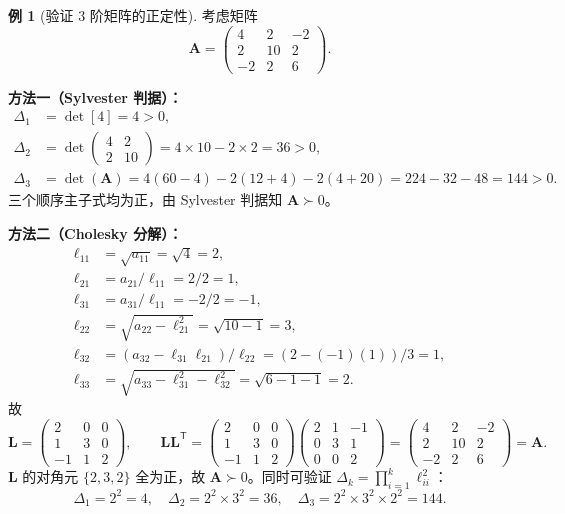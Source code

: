 \documentclass[12pt,a4paper]{article}
\theoremstyle{mystyle}
\theoremstyle{proofstyle}
\theoremstyle{definition}
\newtheorem{example}[theorem]{例}
\theoremstyle{remark}
\newcommand{\T}{^{\mathsf{T}}}
\newcommand{\A}{\mathbf{A}}
\newcommand{\Lmat}{\mathbf{L}}
\begin{document}
\begin{example}[验证 3 阶矩阵的正定性]
考虑矩阵
\[
    \A = \begin{pmatrix}
        4 & 2 & -2 \\
        2 & 10 & 2 \\
        -2 & 2 & 6
    \end{pmatrix}.
\]

\textbf{方法一（Sylvester 判据）：}
\begin{align*}
    \Delta_1 &= \det[4] = 4 > 0, \\
    \Delta_2 &= \det\begin{pmatrix} 4 & 2 \\ 2 & 10 \end{pmatrix} = 4\times 10 - 2\times 2 = 36 > 0, \\
    \Delta_3 &= \det(\A) = 4(60-4) - 2(12+4) - 2(4+20) = 224 - 32 - 48 = 144 > 0.
\end{align*}
三个顺序主子式均为正，由 Sylvester 判据知 $\A \succ 0$。

\textbf{方法二（Cholesky 分解）：}
\begin{align*}
    \ell_{11} &= \sqrt{a_{11}} = \sqrt{4} = 2,\\
    \ell_{21} &= a_{21}/\ell_{11} = 2/2 = 1,\\
    \ell_{31} &= a_{31}/\ell_{11} = -2/2 = -1,\\
    \ell_{22} &= \sqrt{a_{22} - \ell_{21}^2} = \sqrt{10 - 1} = 3,\\
    \ell_{32} &= (a_{32} - \ell_{31}\ell_{21})/\ell_{22} = (2 - (-1)(1))/3 = 1,\\
    \ell_{33} &= \sqrt{a_{33} - \ell_{31}^2 - \ell_{32}^2} = \sqrt{6 - 1 - 1} = 2.
\end{align*}
故
\[
    \Lmat = \begin{pmatrix}
        2 & 0 & 0 \\
        1 & 3 & 0 \\
        -1 & 1 & 2
    \end{pmatrix},\qquad
    \Lmat\Lmat\T = \begin{pmatrix}
        2 & 0 & 0 \\ 1 & 3 & 0 \\ -1 & 1 & 2
    \end{pmatrix}
    \begin{pmatrix}
        2 & 1 & -1 \\ 0 & 3 & 1 \\ 0 & 0 & 2
    \end{pmatrix}
    = \begin{pmatrix}
        4 & 2 & -2 \\ 2 & 10 & 2 \\ -2 & 2 & 6
    \end{pmatrix} = \A.
\]
$\Lmat$ 的对角元 $\{2,3,2\}$ 全为正，故 $\A \succ 0$。同时可验证 $\Delta_k = \prod_{i=1}^k \ell_{ii}^2$：
\[
    \Delta_1 = 2^2 = 4,\quad \Delta_2 = 2^2 \times 3^2 = 36,\quad \Delta_3 = 2^2 \times 3^2 \times 2^2 = 144.
\]
\end{example}
\end{document}
